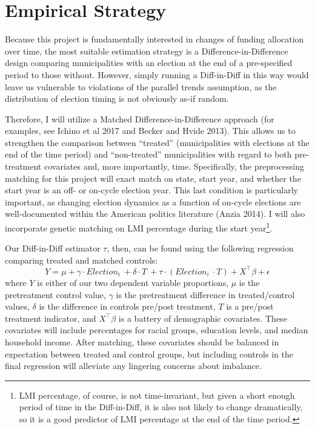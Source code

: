 \documentclass[12pt,a4paper]{article}
\begin{document}
\section{Empirical Strategy}
\par Because this project is fundamentally interested in changes of funding allocation over time, the most suitable estimation strategy is a Difference-in-Difference design comparing municipalities with an election at the end of a pre-specified period to those without. However, simply running a Diff-in-Diff in this way would leave us vulnerable to violations of the parallel trends assumption, as the distribution of election timing is not obviously as-if random. 

\par Therefore, I will utilize a Matched Difference-in-Difference approach (for examples, see Ichino et al 2017 and Becker and Hvide 2013). This allows us to strengthen the comparison between ``treated'' (municipalities with elections at the end of the time period) and ``non-treated'' municipalities with regard to both pre-treatment covariates and, more importantly, time. Specifically, the preprocessing matching for this project will exact match on state, start year, and whether the start year is an off- or on-cycle election year. This last condition is particularly important, as changing election dynamics as a function of on-cycle elections are well-documented within the American politics literature (Anzia 2014). I will also incorporate genetic matching on LMI percentage during the start year\footnote{LMI percentage, of course, is not time-invariant, but given a short enough period of time in the Diff-in-Diff, it is also not likely to change dramatically, so it is a good predictor of LMI percentage at the end of the time period.}.

\par Our Diff-in-Diff estimator $\tau$, then, can be found using the following regression comparing treated and matched controls:
$$ 
Y = \mu + \gamma \cdot Election_i\ + \delta \cdot T\ + \tau \cdot (Election_i\ \cdot T) + X^\top \beta + \epsilon
$$
where $Y$ is either of our two dependent variable proportions, $\mu$ is the pretreatment control value, $\gamma$ is the pretreatment difference in treated/control values, $\delta$ is the difference in controls pre/post treatment, $T$ is a pre/post treatment indicator, and $X^\top \beta$ is a battery of demographic covariates. These covariates will include percentages for racial groups, education levels, and median household income. After matching, these covariates should be balanced in expectation between treated and control groups, but including controls in the final regression will alleviate any lingering concerns about imbalance. 
\end{document}
